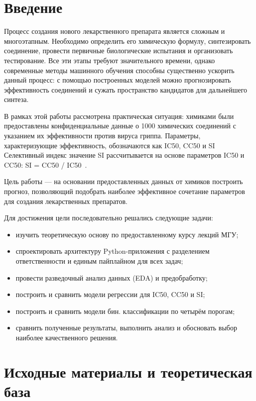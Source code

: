 \documentclass[12pt,a4paper]{report}
\begin{document}
\tableofcontents
\newpage

\chapter*{Введение}

Процесс создания нового лекарственного препарата является сложным и многоэтапным. Необходимо определить его химическую формулу, синтезировать соединение, провести первичные биологические испытания и организовать тестирование. Все эти этапы требуют значительного времени, однако современные методы машинного обучения способны существенно ускорить данный процесс: с помощью построенных моделей можно прогнозировать эффективность соединений и сужать пространство кандидатов для дальнейшего синтеза.

В рамках этой работы рассмотрена практическая ситуация: химиками были предоставлены конфиденциальные данные о 1000 химических соединений с указанием их эффективности против вируса гриппа. Параметры, характеризующие эффективность, обозначаются как IC50, CC50 и SI
Селективный индекс значение SI рассчитывается на основе параметров IC50 и CC50: SI = CC50 / IC50~\cite{cc50-ic50}.

Цель работы --- на основании предоставленных данных от химиков построить прогноз, позволяющий подобрать наиболее эффективное сочетание параметров для создания лекарственных препаратов.

Для достижения цели последовательно решались следующие задачи:
\begin{itemize}
    \item изучить теоретическую основу по предоставленному курсу лекций МГУ;
    \item спроектировать архитектуру Python-приложения с разделением ответственности и единым пайплайном для всех задач;
    \item провести разведочный анализ данных (EDA) и предобработку;
    \item построить и сравнить модели регрессии для IC50, CC50 и SI;
    \item построить и сравнить модели бин. классификации по четырём порогам;
    \item сравнить полученные результаты, выполнить анализ и обосновать выбор наиболее качественного решения.
\end{itemize}

\chapter{Исходные материалы и теоретическая база}
\end{document}
